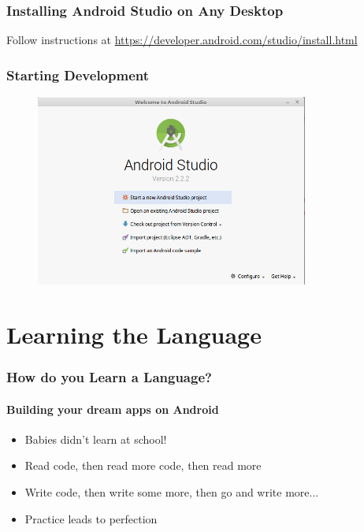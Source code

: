 \documentclass{beamer}
\begin{document}
	\begin{frame}
	\frametitle{Installing Android Studio on Any Desktop}
	Follow instructions at \url{https://developer.android.com/studio/install.html}
	\end{frame}

	\begin{frame}
	\frametitle{Starting Development}
	        \begin{figure}[h]
                \centering
                \includegraphics[width=0.8\textwidth]{./images/android-studio-startpage}
        	\end{figure}
	\end{frame}




\section[Section]{Learning the Language}
	\begin{frame}
	\frametitle{How do you Learn a Language?}
	\framesubtitle{Building your dream apps on Android}
	\begin{itemize}
		\item Babies didn't learn at school!
		\item Read code, then read more code, then read more
		\item Write code, then write some more, then go and write more...
		\item Practice leads to perfection
	\end{itemize}
	\end{frame}
\end{document}
